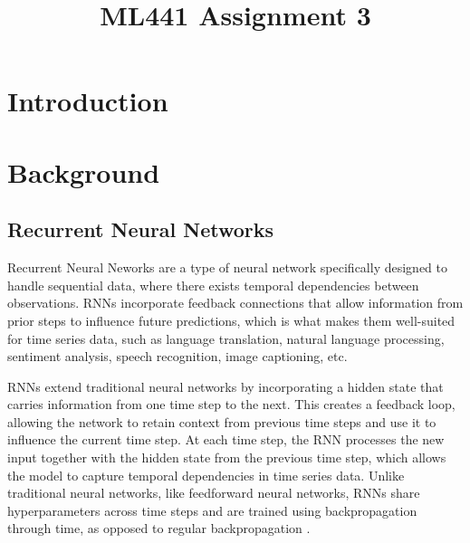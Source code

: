\documentclass[conference]{IEEEtran}
\begin{document}
\title{ML441 Assignment 3}

\author{
}

\maketitle

\begin{abstract}

\end{abstract}

\section{\textbf{Introduction}}

\section{\textbf{Background}}

\subsection{\textbf{Recurrent Neural Networks}}

Recurrent Neural Neworks are a type of neural network specifically designed to handle sequential data, where there exists temporal dependencies between observations. RNNs incorporate feedback connections that allow information from prior steps to influence future predictions, which is what makes them well-suited for time series data, such as language translation, natural language processing, sentiment analysis, speech recognition, image captioning, etc.

RNNs extend traditional neural networks by incorporating a hidden state that carries information from one time step to the next. This creates a feedback loop, allowing the network to retain context from previous time steps and use it to influence the current time step. At each time step, the RNN processes the new input together with the hidden state from the previous time step, which allows the model to capture temporal dependencies in time series data. Unlike traditional neural networks, like feedforward neural networks, RNNs share hyperparameters across time steps and are trained using backpropagation through time, as opposed to regular backpropagation \cite{ibm_rnn}.
\end{document}
